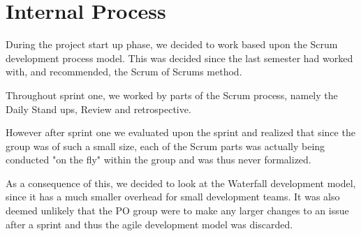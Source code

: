 \section{Internal Process}\label{SEC:InternalProcess1}
During the project start up phase, we decided to work based upon the Scrum development process model.
This was decided since the last semester had worked with, and recommended, the Scrum of Scrums method.

Throughout sprint one, we worked by parts of the Scrum process, namely the Daily Stand ups, Review and retrospective.

However after sprint one we evaluated upon the sprint and realized that since the group was of such a small size, each of the Scrum parts was actually being conducted "on the fly" within the group and was thus never formalized.

As a consequence of this, we decided to look at the Waterfall development model, since it has a much smaller overhead for small development teams.
It was also deemed unlikely that the PO group were to make any larger changes to an issue after a sprint and thus the agile development model was discarded.
